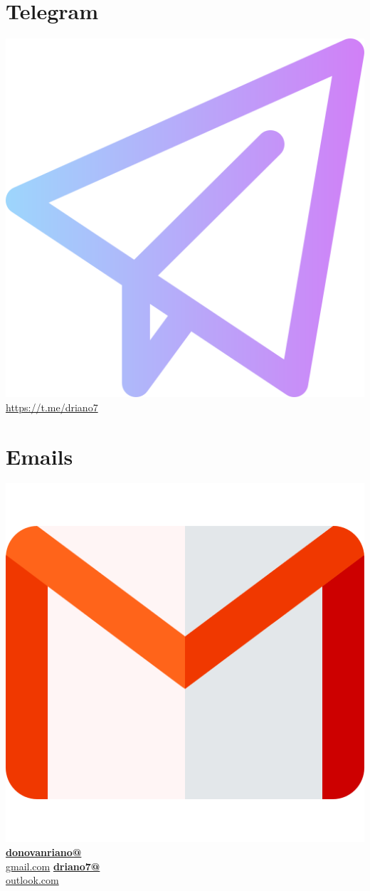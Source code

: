 \documentclass[]{friggeri-cv}
\begin{document}
\begin{aside}
    \section{Telegram} \includegraphics[scale=0.028]{logos/telegram.png}
    \url{https://t.me/driano7}
    ~
    \section{Emails} \includegraphics[scale=0.028]{logos/gmail.png}\href{mailto:donovanriano@gmail.com}
    \href{mailto:donovanriano@gmail.com}{\textbf{donovanriano@}\\gmail.com}
    \href{mailto:driano7@outlook.com}{\textbf{driano7@}\\outlook.com}
    ~

\end{aside}
\end{document}
